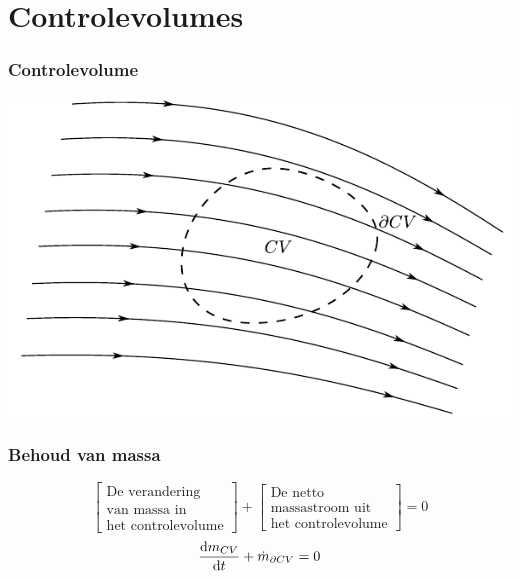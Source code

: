 \documentclass[t]{beamer}
\begin{document}
  	\section{Controlevolumes}	
  	\begin{frame}
		\frametitle{Controlevolume}
		\center
		\includegraphics{../fig/controlevolumes/Controlevolume_met_stroomlijnen}
  	\end{frame}
  	\begin{frame}
		\frametitle{Behoud van massa}
		\vspace{1cm}
		\begin{equation*}
			\left[
				\begin{array}{c}
					\mbox{De verandering} \\ \mbox{van massa in} \\ \mbox{het controlevolume}
				\end{array}
			\right]
			+
			\left[
				\begin{array}{c}
					\mbox{De netto} \\ \mbox{massastroom uit} \\ \mbox{het controlevolume}
				\end{array}
			\right]
			= 0
		\end{equation*}
		\vspace{1cm}
		\pause
		\begin{equation*}
			\frac{\mathrm{d} m_{CV}}{\mathrm{d} t} + \dot{m}_{\partial CV} = 0
		\end{equation*}
	\end{frame}	
\end{document}
